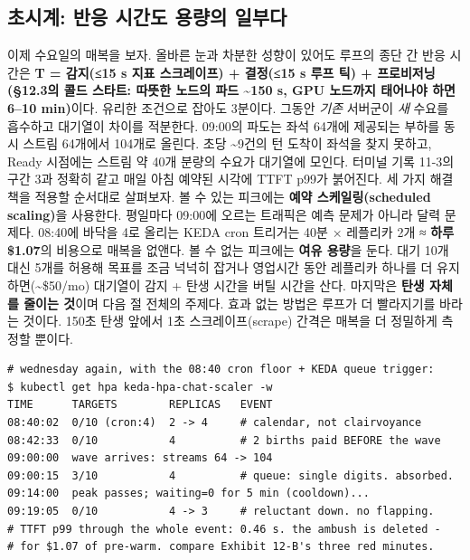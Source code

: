 \subsection*{초시계: 반응 시간도 용량의 일부다}

이제 수요일의 매복을 보자. 올바른 눈과 차분한 성향이 있어도 루프의 종단 간 반응 시간은 \textbf{T = 감지(≤15 s 지표 스크레이프) + 결정(≤15 s 루프 틱) + 프로비저닝(§12.3의 콜드 스타트: 따뜻한 노드의 파드 \textasciitilde{}150 s, GPU 노드까지 태어나야 하면 6–10 min)}이다. 유리한 조건으로 잡아도 3분이다. 그동안 \textit{기존} 서버군이 \textit{새} 수요를 흡수하고 대기열이 차이를 적분한다. 09:00의 파도는 좌석 64개에 제공되는 부하를 동시 스트림 64개에서 104개로 올린다. 초당 \textasciitilde{}9건의 턴 도착이 좌석을 찾지 못하고, Ready 시점에는 스트림 약 40개 분량의 수요가 대기열에 모인다. 터미널 기록 11-3의 구간 3과 정확히 같고 매일 아침 예약된 시각에 TTFT p99가 붉어진다. 세 가지 해결책을 적용할 순서대로 살펴보자. 볼 수 있는 피크에는 \textbf{예약 스케일링(scheduled scaling)}을 사용한다. 평일마다 09:00에 오르는 트래픽은 예측 문제가 아니라 달력 문제다. 08:40에 바닥을 4로 올리는 KEDA cron 트리거는 40분 × 레플리카 2개 ≈ \textbf{하루 \$1.07}의 비용으로 매복을 없앤다. 볼 수 없는 피크에는 \textbf{여유 용량}을 둔다. 대기 10개 대신 5개를 허용해 목표를 조금 넉넉히 잡거나 영업시간 동안 레플리카 하나를 더 유지하면(\textasciitilde{}\$50/mo) 대기열이 감지 + 탄생 시간을 버틸 시간을 산다. 마지막은 \textbf{탄생 자체를 줄이는 것}이며 다음 절 전체의 주제다. 효과 없는 방법은 루프가 더 빨라지기를 바라는 것이다. 150초 탄생 앞에서 1초 스크레이프(scrape) 간격은 매복을 더 정밀하게 측정할 뿐이다.

\begin{terminalbox}
\begin{Verbatim}[breaklines=true,breakanywhere=true,fontsize=\small,formatcom=\color{tbbtermfg},codes=\tbbcodeactive]
# wednesday again, with the 08:40 cron floor + KEDA queue trigger:
$ kubectl get hpa keda-hpa-chat-scaler -w
TIME      TARGETS        REPLICAS   EVENT
08:40:02  0/10 (cron:4)  2 -> 4     # calendar, not clairvoyance
08:42:33  0/10           4          # 2 births paid BEFORE the wave
09:00:00  wave arrives: streams 64 -> 104
09:00:15  3/10           4          # queue: single digits. absorbed.
09:14:00  peak passes; waiting=0 for 5 min (cooldown)...
09:19:05  0/10           4 -> 3     # reluctant down. no flapping.
# TTFT p99 through the whole event: 0.46 s. the ambush is deleted -
# for $1.07 of pre-warm. compare Exhibit 12-B's three red minutes.
\end{Verbatim}
\end{terminalbox}

